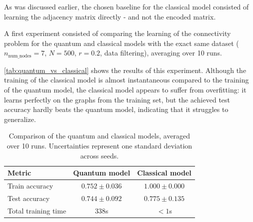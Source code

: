 \documentclass{article}
\theoremstyle{definition}
\theoremstyle{plain}
\begin{document}
As was discussed earlier, the chosen baseline for the classical model consisted of learning the adjacency matrix directly - and not the encoded matrix.

A first experiment consisted of comparing the learning of the connectivity problem for the quantum and classical models with the exact same dataset ($n_{\text{num\_nodes}} = 7$, $N = 500$, $r=0.2$, data filtering), averaging over 10 runs.

\autoref{tab:quantum_vs_classical} shows the results of this experiment. Although the training of the classical model is almost instantaneous compared to the training of the quantum model, the classical model appears to suffer from overfitting: it learns perfectly on the graphs from the training set, but the achieved test accuracy hardly beats the quantum model, indicating that it struggles to generalize.

\begin{table}[h]
\centering
\begin{tabular}{lcc}
\toprule
\textbf{Metric} & \textbf{Quantum model} & \textbf{Classical model} \\
\midrule
Train accuracy      & $0.752 \pm 0.036$ & $1.000 \pm 0.000$ \\
Test accuracy       & $0.744 \pm 0.092$ & $0.775 \pm 0.135$ \\
Total training time & $338$s & $<1$s \\
\bottomrule
\end{tabular}
\caption{Comparison of the quantum and classical models, averaged over 10 runs. Uncertainties represent one standard deviation across seeds.}
\label{tab:quantum_vs_classical}
\end{table}



\end{document}
